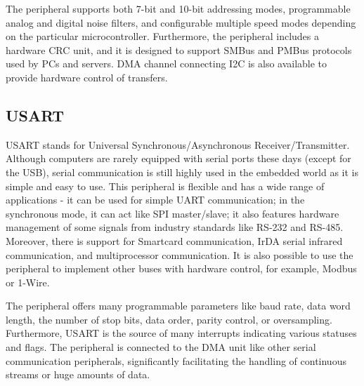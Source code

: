 The peripheral supports both 7-bit and 10-bit addressing modes, programmable analog and digital noise filters, and configurable multiple speed modes depending on the particular microcontroller. Furthermore, the peripheral includes a hardware CRC unit, and it is designed to support SMBus and PMBus protocols used by PCs and servers. DMA channel connecting I2C is also available to provide hardware control of transfers.

	\subsection{USART}
	\label{sub:usart}
USART stands for Universal Synchronous/Asynchronous Receiver/Transmitter. Although computers are rarely equipped with serial ports these days (except for the USB), serial communication is still highly used in the embedded world as it is simple and easy to use. This peripheral is flexible and has a wide range of applications - it can be used for simple UART communication; in the synchronous mode, it can act like SPI master/slave; it also features hardware management of some signals from industry standards like RS-232 and RS-485. Moreover, there is support for Smartcard communication, IrDA serial infrared communication, and multiprocessor communication. It is also possible to use the peripheral to implement other buses with hardware control, for example, Modbus or 1-Wire.  

The peripheral offers many programmable parameters like baud rate, data word length, the number of stop bits, data order, parity control, or oversampling. Furthermore, USART is the source of many interrupts indicating various statuses and flags. The peripheral is connected to the DMA unit like other serial communication peripherals, significantly facilitating the handling of continuous streams or huge amounts of data.
